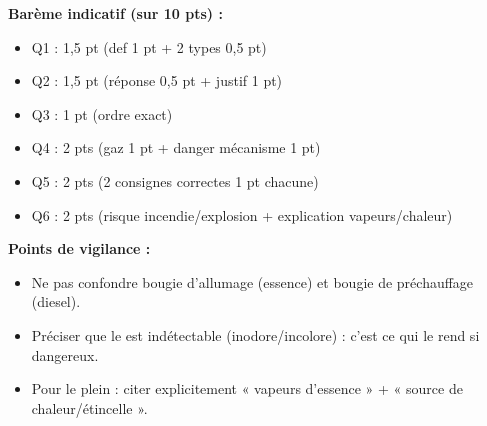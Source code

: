 \documentclass[11pt]{article}
\begin{document}
\begin{corrige}
\textbf{Barème indicatif (sur 10 pts) :}
\begin{itemize}
\item Q1 : 1,5 pt (def 1 pt + 2 types 0,5 pt)
\item Q2 : 1,5 pt (réponse 0,5 pt + justif 1 pt)
\item Q3 : 1 pt (ordre exact)
\item Q4 : 2 pts (gaz 1 pt + danger mécanisme 1 pt)
\item Q5 : 2 pts (2 consignes correctes 1 pt chacune)
\item Q6 : 2 pts (risque incendie/explosion + explication vapeurs/chaleur)
\end{itemize}

\textbf{Points de vigilance :}
\begin{itemize}
\item Ne pas confondre bougie d'allumage (essence) et bougie de préchauffage (diesel).
\item Préciser que le  est indétectable (inodore/incolore) : c'est ce qui le rend si dangereux.
\item Pour le plein : citer explicitement « vapeurs d'essence » + « source de chaleur/étincelle ».
\end{itemize}
\end{corrige}
\end{document}
